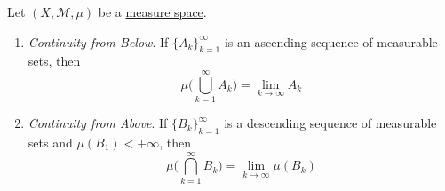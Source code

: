   \begin{theorem}
    \label{thm:continuity-of-measure}
    Let $(X, \mathcal{M}, \mu)$ be a \hyperref[def:measure-space]{measure space}. 
    \begin{enumerate}
      \item \textit{Continuity from Below}. If $\{A_k\}_{k=1}^\infty$ is an ascending sequence of measurable sets, then 
        \begin{equation}
          \mu \bigg( \bigcup_{k=1}^\infty A_k \bigg) = \lim_{k \to \infty} A_k
        \end{equation}
      \item \textit{Continuity from Above}. If $\{B_k\}_{k=1}^\infty$ is a descending sequence of measurable sets and $\mu(B_1) < +\infty$, then 
        \begin{equation}
          \mu \bigg( \bigcap_{k=1}^\infty B_k \bigg) = \lim_{k \to \infty} \mu(B_k)
        \end{equation}
    \end{enumerate}
  \end{theorem}
